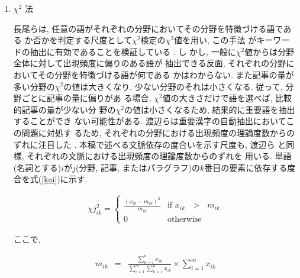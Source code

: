 \begin{enumerate}

\item $\chi^2$ 法

長尾らは, 任意の語がそれぞれの分野においてその分野を特徴づける語である
か否かを判定する尺度として\hspace{-0.1mm}$\chi^{2}$\hspace{-0.2mm}検定の\hspace{-0.1mm}$\chi^{2}$\hspace{-0.2mm}値を用い, この手法
がキーワードの抽出に有効であることを検証している \cite{Nagao1976}. し
かし, 一般に\hspace{-0.1mm}$\chi^{2}$\hspace{-0.2mm}値からは分野全体に対して出現頻度に偏りのある語が
抽出できる反面, それぞれの分野においてその分野を特徴づける語が何である
かはわからない. \hspace{-0.1mm}また記事の量が多い分野の\hspace{-0.1mm}$\chi^{2}$\hspace{-0.2mm}の値は大きくなり, 
少ない分野のそれは小さくなる.  従って, 分野ごとに記事の量に偏りがあ
る場合, \hspace{-0.1mm}$\chi^{2}$\hspace{-0.2mm}値の大きさだけで語を選べば, 比較的記事の量が少ない分
野の\hspace{-0.1mm}$\chi^{2}$\hspace{-0.2mm}の値は小さくなるため, 結果的に重要語を抽出することができ
ない可能性がある.  渡辺らは重要漢字の自動抽出においてこの問題に対処す
るため, それぞれの分野における出現頻度の理論度数からのずれに注目した
\cite{Watanabe1994}.  本稿で述べる文脈依存の度合いを示す尺度も, 渡辺ら
と同様, それぞれの文脈における出現頻度の理論度数からのずれを
用いる.  単語(名詞とする)$i$が$j$(分野, 記事, またはパラグラフ)の$k$番目の要素に依存する度合を式(\ref{kai})に示す.

\vspace*{-8mm}
\begin{eqnarray}
\chi j^2_{ik} = \left\{ \begin{array}{ll}
	 \frac{(x_{ik} - m_{ik})^2}{m_{ik}} & \mbox{if $x_{ik}$ $>$ $m_{ik}$} \\
		0 &\mbox{otherwise}
	\end{array} \right. \label{kai}
\end{eqnarray}

\hspace*{1cm}ここで,

\vspace*{-5mm}
\begin{eqnarray}
m_{ik} & = & \frac{\sum^{n}_{k=1}x_{ik}}{\sum^{m}_{i=1}
\sum^{n}_{k=1}x_{ik}}
\times \sum^{m}_{i=1}x_{ik} \nonumber
\end{eqnarray}


\end{enumerate}

